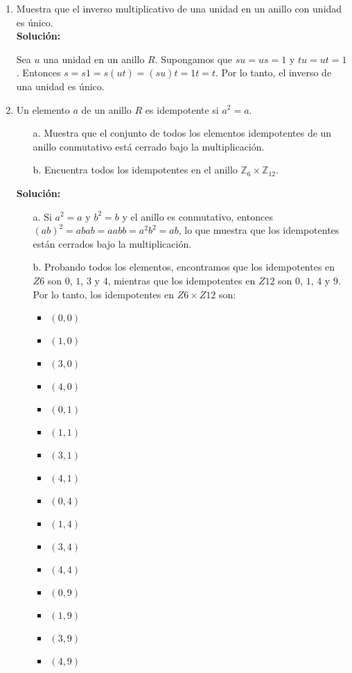 \begin{enumerate}
	\item Muestra que el inverso multiplicativo de una unidad en un anillo con unidad es único.
	\\ \textbf{Solución:}
	
	Sea $u$ una unidad en un anillo $R$. Supongamos que $su = us = 1$ y $tu = ut = 1$. Entonces $s = s1 = s(ut) = (su)t = 1t = t$. Por lo tanto, el inverso de una unidad es único.
	
	\item Un elemento $a$ de un anillo $R$ es idempotente si $a^2 = a$.
	\begin{itemize}
		\item[a.] Muestra que el conjunto de todos los elementos idempotentes de un anillo conmutativo está cerrado bajo la multiplicación.
		\item[b.] Encuentra todos los idempotentes en el anillo $\mathbb{Z}_6 \times \mathbb{Z}_{12}$.
	\end{itemize}
	\textbf{Solución:}
	
	\begin{itemize}
		\item[a.] 	Si $a^2 = a$ y $b^2 = b$ y el anillo es conmutativo, entonces $(ab)^2 = abab = aabb = a^2b^2 = ab$, lo que muestra que los idempotentes están cerrados bajo la multiplicación.
		\item[b.] Probando todos los elementos, encontramos que los idempotentes en $Z6$ son $0$, $1$, $3$ y $4$, mientras que los idempotentes en $Z12$ son $0$, $1$, $4$ y $9$. Por lo tanto, los idempotentes en $Z6 \times Z12$ son:
		\begin{multicols}{2}
			\begin{itemize}
				
				\item $(0, 0)$
				\item $(1, 0)$
				\item $(3, 0)$
				\item $(4, 0)$
				\item $(0, 1)$
				\item $(1, 1)$
				\item $(3, 1)$
				\item $(4, 1)$
				\item $(0, 4)$
				\item $(1, 4)$
				\item $(3, 4)$
				\item $(4, 4)$
				\item $(0, 9)$
				\item $(1, 9)$
				\item $(3, 9)$
				\item $(4, 9)$
			\end{itemize}
		\end{multicols}
		

\end{itemize}
\end{enumerate}
